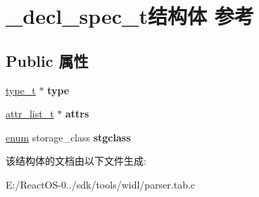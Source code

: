 \hypertarget{struct__decl__spec__t}{}\section{\+\_\+decl\+\_\+spec\+\_\+t结构体 参考}
\label{struct__decl__spec__t}
\subsection*{Public 属性}
\begin{DoxyCompactItemize}
\item 
\mbox{\label{struct__decl__spec__t_a9481eedbe5caee7cd9d8bcb28a2da947}} 
\hyperlink{struct__type__t}{type\+\_\+t} $\ast$ {\bfseries type}
\item 
\mbox{\label{struct__decl__spec__t_a380ef9d7962e69b3c054541ae5fb2312}} 
\hyperlink{classlist}{attr\+\_\+list\+\_\+t} $\ast$ {\bfseries attrs}
\item 
\mbox{\label{struct__decl__spec__t_afeac1f25ddc6fc0a489b073f5a8f26a0}} 
\hyperlink{interfaceenum}{enum} storage\+\_\+class {\bfseries stgclass}
\end{DoxyCompactItemize}


该结构体的文档由以下文件生成\+:\begin{DoxyCompactItemize}
\item 
E\+:/\+React\+O\+S-\/0../sdk/tools/widl/parser.\+tab.\+c\end{DoxyCompactItemize}
